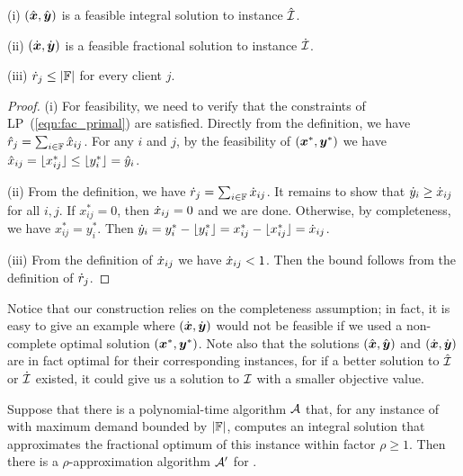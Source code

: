 \documentclass[11pt]{article}
\begin{document}

\begin{lemma}\label{lem: polynomial demands partition}
{\rm (i)}
  $(\hat{\boldsymbol{x}}, \hat{\boldsymbol{y}})$ is a feasible integral solution to
  instance ${\hat{\cal I}}$.

\noindent
{\rm (ii)}
  $(\dot{\boldsymbol{x}}, \dot{\boldsymbol{y}})$ is a feasible fractional
  solution to instance ${\dot{\cal I}}$.

\noindent
{\rm (iii)}
${\dot r}_j\leq |\mathbb{F}|$ for every client $j$.

\end{lemma}

\begin{proof}
(i) For feasibility, we need to verify that the constraints of LP~(\ref{eqn:fac_primal})
are satisfied. Directly from the definition, we have ${\hat r}_j = \sum_{i\in\mathbb{F}} {\hat x}_{ij}$.
For any $i$ and $j$, by the feasibility of $(\boldsymbol{x}^\ast,\boldsymbol{y}^\ast)$ we have
${\hat x}_{ij} = { \lfloor x_{ij}^\ast \rfloor } \le { \lfloor y^\ast_i \rfloor } = {\hat y}_i$.

(ii) From the definition, we have  ${\dot r}_j = \sum_{i\in\mathbb{F}} {\dot x}_{ij}$.
It remains to show that ${\dot y}_i \geq {\dot x}_{ij}$ for all $i,j$. 
If $x_{ij}^\ast=0$, then ${\dot x}_{ij}=0$ and we are done. 
Otherwise, by completeness, we have $x_{ij}^\ast=y_i^\ast$. 
Then  ${\dot y}_i = y_i^\ast - { \lfloor y_i^\ast \rfloor } = x_{ij}^\ast - { \lfloor x_{ij}^\ast \rfloor } ={\dot x}_{ij}$. 

(iii) From the definition of ${\dot x}_{ij}$ we have
  ${\dot x}_{ij} < 1$.  Then the bound follows from the definition of ${\dot r}_j$.
\end{proof}

Notice that our construction relies on the completeness assumption; in fact, it is
easy to give an example where $(\dot{\boldsymbol{x}}, \dot{\boldsymbol{y}})$ would not be feasible if we
used a non-complete optimal solution $(\boldsymbol{x}^\ast,\boldsymbol{y}^\ast)$.
Note also that the solutions $(\hat{\boldsymbol{x}},\hat{\boldsymbol{y}})$ and $(\dot{\boldsymbol{x}}, \dot{\boldsymbol{y}})$ are in fact
optimal for their corresponding instances, for if a better solution to ${\hat{\cal I}}$ or
${\dot{\cal I}}$ existed, it could
give us a solution to $\mathcal{I}$ with a smaller objective value.


\begin{theorem}\label{thm: reduction to polynomial}
  Suppose that there is a polynomial-time algorithm ${\cal A}$
  that, for any instance of {\FTFP} with maximum demand
  bounded by $|\mathbb{F}|$, computes an integral solution
  that approximates the fractional optimum of this instance
  within factor $\rho\geq 1$.  Then there is a
  $\rho$-approximation algorithm ${\cal A}'$ for {\FTFP}.
\end{theorem}
\end{document}
